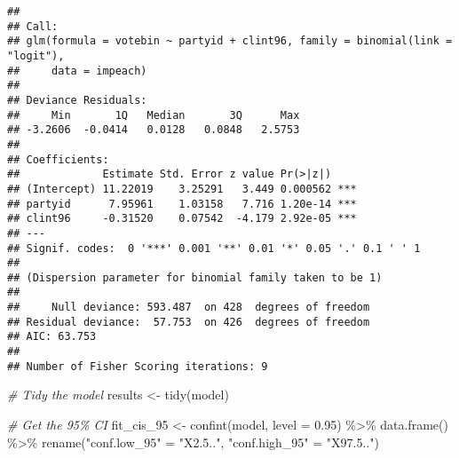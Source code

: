 \documentclass[
]{article}
\newenvironment{Shaded}{\begin{snugshade}}{\end{snugshade}}
\newcommand{\AttributeTok}[1]{\textcolor[rgb]{0.77,0.63,0.00}{#1}}
\newcommand{\CommentTok}[1]{\textcolor[rgb]{0.56,0.35,0.01}{\textit{#1}}}
\newcommand{\DecValTok}[1]{\textcolor[rgb]{0.00,0.00,0.81}{#1}}
\newcommand{\FloatTok}[1]{\textcolor[rgb]{0.00,0.00,0.81}{#1}}
\newcommand{\FunctionTok}[1]{\textcolor[rgb]{0.00,0.00,0.00}{#1}}
\newcommand{\NormalTok}[1]{#1}
\newcommand{\OtherTok}[1]{\textcolor[rgb]{0.56,0.35,0.01}{#1}}
\newcommand{\SpecialCharTok}[1]{\textcolor[rgb]{0.00,0.00,0.00}{#1}}
\newcommand{\StringTok}[1]{\textcolor[rgb]{0.31,0.60,0.02}{#1}}
\begin{document}
\begin{Shaded}
\end{Shaded}

\begin{verbatim}
## 
## Call:
## glm(formula = votebin ~ partyid + clint96, family = binomial(link = "logit"), 
##     data = impeach)
## 
## Deviance Residuals: 
##     Min       1Q   Median       3Q      Max  
## -3.2606  -0.0414   0.0128   0.0848   2.5753  
## 
## Coefficients:
##             Estimate Std. Error z value Pr(>|z|)    
## (Intercept) 11.22019    3.25291   3.449 0.000562 ***
## partyid      7.95961    1.03158   7.716 1.20e-14 ***
## clint96     -0.31520    0.07542  -4.179 2.92e-05 ***
## ---
## Signif. codes:  0 '***' 0.001 '**' 0.01 '*' 0.05 '.' 0.1 ' ' 1
## 
## (Dispersion parameter for binomial family taken to be 1)
## 
##     Null deviance: 593.487  on 428  degrees of freedom
## Residual deviance:  57.753  on 426  degrees of freedom
## AIC: 63.753
## 
## Number of Fisher Scoring iterations: 9
\end{verbatim}

\begin{Shaded}
\begin{Highlighting}[]
\CommentTok{\# Tidy the model}
\NormalTok{results }\OtherTok{\textless{}{-}} \FunctionTok{tidy}\NormalTok{(model)}

\CommentTok{\# Get the 95\% CI}
\NormalTok{fit\_cis\_95 }\OtherTok{\textless{}{-}} \FunctionTok{confint}\NormalTok{(model, }\AttributeTok{level =} \FloatTok{0.95}\NormalTok{) }\SpecialCharTok{\%\textgreater{}\%} 
  \FunctionTok{data.frame}\NormalTok{() }\SpecialCharTok{\%\textgreater{}\%}
  \FunctionTok{rename}\NormalTok{(}\StringTok{"conf.low\_95"} \OtherTok{=} \StringTok{"X2.5.."}\NormalTok{,}
         \StringTok{"conf.high\_95"} \OtherTok{=} \StringTok{"X97.5.."}\NormalTok{)}
\end{Highlighting}
\end{Shaded}
\end{document}
